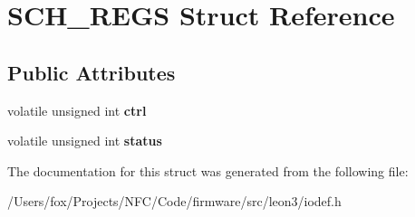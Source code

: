 \hypertarget{struct_s_c_h___r_e_g_s}{
\section{SCH\_\-REGS Struct Reference}
\label{struct_s_c_h___r_e_g_s}
}
\subsection*{Public Attributes}
\begin{DoxyCompactItemize}
\item 
\hypertarget{struct_s_c_h___r_e_g_s_a9c86ecfa7c024d96e45fc89f6ba3c36f}{
volatile unsigned int {\bfseries ctrl}}
\label{struct_s_c_h___r_e_g_s_a9c86ecfa7c024d96e45fc89f6ba3c36f}

\item 
\hypertarget{struct_s_c_h___r_e_g_s_a449029c47331cd440873e80531d5a355}{
volatile unsigned int {\bfseries status}}
\label{struct_s_c_h___r_e_g_s_a449029c47331cd440873e80531d5a355}

\end{DoxyCompactItemize}


The documentation for this struct was generated from the following file:\begin{DoxyCompactItemize}
\item 
/Users/fox/Projects/NFC/Code/firmware/src/leon3/iodef.h\end{DoxyCompactItemize}
